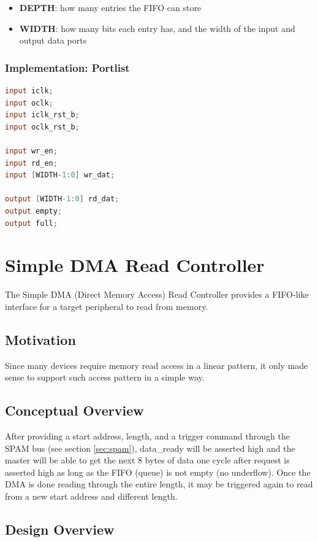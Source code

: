 \documentclass[10pt]{article}
\begin{document}
\begin{itemize}
\item{\textbf{DEPTH}: how many entries the FIFO can store}
\item{\textbf{WIDTH}: how many bits each entry has, and the width of the input and
output data ports}
\end{itemize}

\subsubsection{Implementation: Portlist}
\begin{lstlisting}[basicstyle=\footnotesize,language=Verilog]
input iclk;
input oclk;
input iclk_rst_b;
input oclk_rst_b;
 
input wr_en;
input rd_en;
input [WIDTH-1:0] wr_dat;
 
output [WIDTH-1:0] rd_dat;
output empty;
output full;
\end{lstlisting}

\section{Simple DMA Read Controller}
\label{sec:dmac}

The Simple DMA (Direct Memory Access) Read Controller provides a FIFO-like
interface for a target peripheral to read from memory.

\subsection{Motivation}

Since many devices require memory read access in a linear pattern, it only
made sense to support such access pattern in a simple way.

\subsection{Conceptual Overview}

After providing a start address, length, and a trigger command through the
SPAM bus (see section \ref{sec:spam}), data\_ready will be asserted high and
the master will be able to get the next 8 bytes of data one cycle after
request is asserted high as long as the FIFO (queue) is not empty (no
underflow).  Once the DMA is done reading through the entire length, it may
be triggered again to read from a new start address and different length.

\subsection{Design Overview}
\end{document}
